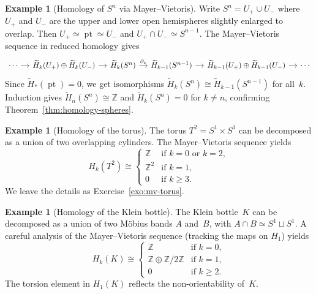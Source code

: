 \documentclass[12pt,a4paper,openany]{book}
\theoremstyle{definition}
\newtheorem{example}[definition]{Example}
\theoremstyle{plain}
\theoremstyle{remark}
\newcommand{\Z}{\mathbb{Z}}
\begin{document}
\begin{example}[Homology of $S^n$ via Mayer--Vietoris]\label{ex:sphere-mv}
Write $S^n=U_+\cup U_-$ where $U_+$ and $U_-$ are the upper and lower
open hemispheres slightly enlarged to overlap.  Then $U_+\simeq\operatorname{pt}\simeq U_-$
and $U_+\cap U_-\simeq S^{n-1}$.  The Mayer--Vietoris sequence in
reduced homology gives
\[
\begin{tikzcd}[column sep=1.1em]
  \cdots \ar[r]
  & \widetilde{H}_k(U_+)\oplus\widetilde{H}_k(U_-) \ar[r]
  & \widetilde{H}_k(S^n) \ar[r,"\partial_*"]
  & \widetilde{H}_{k-1}(S^{n-1}) \ar[r]
  & \widetilde{H}_{k-1}(U_+)\oplus\widetilde{H}_{k-1}(U_-) \ar[r]
  & \cdots
\end{tikzcd}
\]
Since $\widetilde{H}_*(\operatorname{pt})=0$, we get isomorphisms
$\widetilde{H}_k(S^n)\cong\widetilde{H}_{k-1}(S^{n-1})$ for all~$k$.
Induction gives $\widetilde{H}_n(S^n)\cong\Z$ and
$\widetilde{H}_k(S^n)=0$ for $k\ne n$, confirming
Theorem~\ref{thm:homology-spheres}.
\end{example}

\begin{example}[Homology of the torus]\label{ex:homology-torus}
The torus $T^2=S^1\times S^1$ can be decomposed as a union of two
overlapping cylinders.  The Mayer--Vietoris sequence yields
\[
  H_k(T^2)\cong
  \begin{cases}
    \Z & \text{if } k=0 \text{ or } k=2,\\
    \Z^2 & \text{if } k=1,\\
    0 & \text{if } k\ge 3.
  \end{cases}
\]
We leave the details as Exercise~\ref{exo:mv-torus}.
\end{example}

\begin{example}[Homology of the Klein bottle]\label{ex:homology-klein}
The Klein bottle~$K$ can be decomposed as a union of two M\"obius bands
$A$ and~$B$, with $A\cap B\simeq S^1\sqcup S^1$.  A careful analysis
of the Mayer--Vietoris sequence (tracking the maps on $H_1$) yields
\[
  H_k(K)\cong
  \begin{cases}
    \Z & \text{if } k=0,\\
    \Z\oplus\Z/2\Z & \text{if } k=1,\\
    0 & \text{if } k\ge 2.
  \end{cases}
\]
The torsion element in $H_1(K)$ reflects the non-orientability of~$K$.
\end{example}
\end{document}
